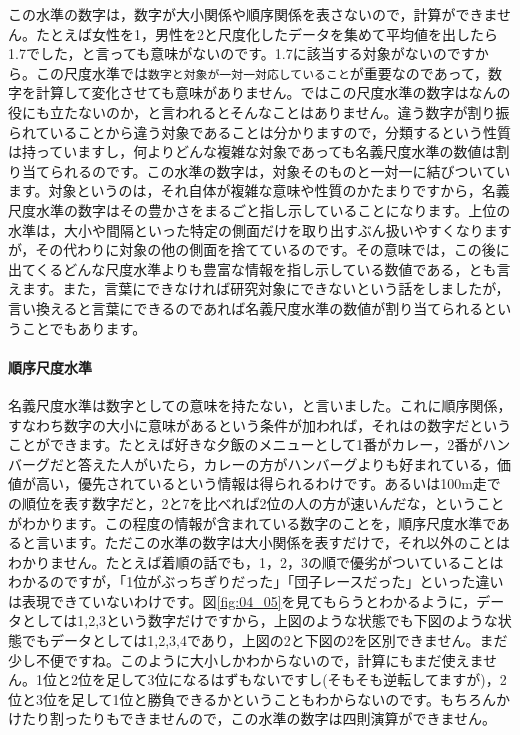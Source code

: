 \documentclass{ltjsbook}
\begin{document}
この水準の数字は，数字が大小関係や順序関係を表さないので，計算ができません。たとえば女性を1，男性を2と尺度化したデータを集めて平均値を出したら1.7でした，と言っても意味がないのです。1.7に該当する対象がないのですから。この尺度水準では\texttt{数字と対象が一対一対応していること}が重要なのであって，数字を計算して変化させても意味がありません。ではこの尺度水準の数字はなんの役にも立たないのか，と言われるとそんなことはありません。違う数字が割り振られていることから違う対象であることは分かりますので，分類するという性質は持っていますし，何よりどんな複雑な対象であっても名義尺度水準の数値は割り当てられるのです。この水準の数字は，対象そのものと一対一に結びついています。対象というのは，それ自体が複雑な意味や性質のかたまりですから，名義尺度水準の数字はその豊かさをまるごと指し示していることになります。上位の水準は，大小や間隔といった特定の側面だけを取り出すぶん扱いやすくなりますが，その代わりに対象の他の側面を捨てているのです。その意味では，この後に出てくるどんな尺度水準よりも豊富な情報を指し示している数値である，とも言えます。また，言葉にできなければ研究対象にできないという話をしましたが，言い換えると言葉にできるのであれば名義尺度水準の数値が割り当てられるということでもあります。

\paragraph{順序尺度水準}
名義尺度水準は数字としての意味を持たない，と言いました。これに順序関係，すなわち数字の大小に意味があるという条件が加われば，それはの数字だということができます。たとえば好きな夕飯のメニューとして1番がカレー，2番がハンバーグだと答えた人がいたら，カレーの方がハンバーグよりも好まれている，価値が高い，優先されているという情報は得られるわけです。あるいは100m走での順位を表す数字だと，2と7を比べれば2位の人の方が速いんだな，ということがわかります。この程度の情報が含まれている数字のことを，順序尺度水準であると言います。ただこの水準の数字は大小関係を表すだけで，それ以外のことはわかりません。たとえば着順の話でも，1，2，3の順で優劣がついていることはわかるのですが，「1位がぶっちぎりだった」「団子レースだった」といった違いは表現できていないわけです。図\ref{fig:04_05}を見てもらうとわかるように，データとしては1,2,3という数字だけですから，上図のような状態でも下図のような状態でもデータとしては1,2,3,4であり，上図の2と下図の2を区別できません。まだ少し不便ですね。このように大小しかわからないので，計算にもまだ使えません。1位と2位を足して3位になるはずもないですし(そもそも逆転してますが)，2位と3位を足して1位と勝負できるかということもわからないのです。もちろんかけたり割ったりもできませんので，この水準の数字は四則演算ができません。
\end{document}
